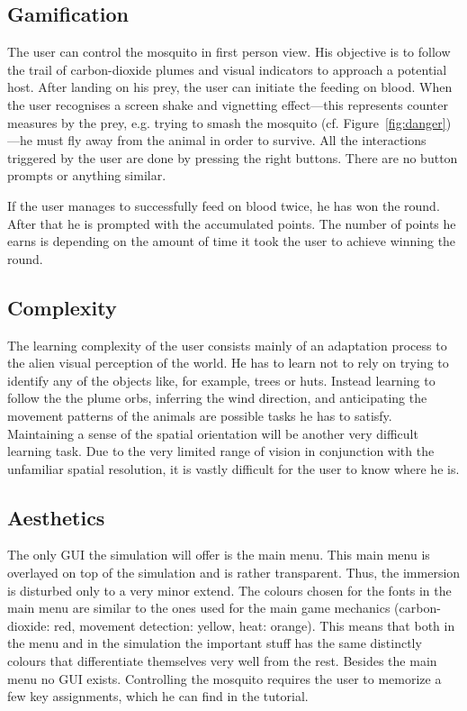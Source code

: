 \documentclass{sig-alternate-05-2015}
\begin{document}
\subsection{Gamification}
\label{sec:game}
\noindent
The user can control the mosquito in first person view. His objective is to follow the trail of carbon-dioxide plumes and visual indicators to approach a potential host. After landing on his prey, the user can initiate the feeding on blood. When the user recognises a screen shake and vignetting effect---this represents counter measures by the prey, e.g. trying to smash the mosquito (cf. Figure~\ref{fig:danger})---he must fly away from the animal in order to survive. All the interactions triggered by the user are done by pressing the right buttons. There are no button prompts or anything similar.

If the user manages to successfully feed on blood twice, he has won the round. After that he is prompted with the accumulated points. The number of points he earns is depending on the amount of time it took the user to achieve winning the round. 


\subsection{Complexity}
\label{sec:complexity}
\noindent
The learning complexity of the user consists mainly of an adaptation process to the alien visual perception of the world. He has to learn not to rely on trying to identify any of the objects like, for example, trees or huts. Instead learning to follow the the plume orbs, inferring the wind direction, and anticipating the movement patterns of the animals are possible tasks he has to satisfy. Maintaining a sense of the spatial orientation will be another very difficult learning task. Due to the very limited range of vision in conjunction with the unfamiliar spatial resolution, it is vastly difficult for the user to know where he is.

\subsection{Aesthetics}
\label{sec:aesthetics}
\noindent
The only GUI the simulation will offer is the main menu. This main menu is overlayed on top of the simulation and is rather transparent. Thus, the immersion is disturbed only to a very minor extend. The colours chosen for the fonts in the main menu are similar to the ones used for the main game mechanics (carbon-dioxide: red, movement detection: yellow, heat: orange). This means that both in the menu and in the simulation the important stuff has the same distinctly colours that differentiate themselves very well from the rest.
Besides the main menu no GUI exists. Controlling the mosquito requires the user to memorize a few key assignments, which he can find in the tutorial.
\end{document}
